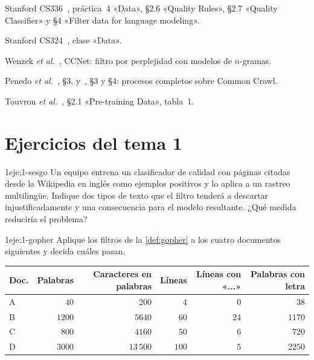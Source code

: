\begin{lecturas}
\item Stanford CS336~\cite{cs336a4}, práctica~4 «Data», §2.6 «Quality Rules», §2.7 «Quality Classifier» y §4 «Filter data for language modeling».
\item Stanford CS324~\cite{cs324}, clase «Data».
\item Wenzek \emph{et al.}~\cite{wenzek}, CCNet: filtro por perplejidad con modelos de $n$-gramas.
\item Penedo \emph{et al.}~\cite{refinedweb}, §3, y~\cite{fineweb}, §3 y §4: procesos completos sobre Common Crawl.
\item Touvron \emph{et al.}~\cite{llama}, §2.1 «Pre-training Data», tabla~1.
\end{lecturas}

\section*{Ejercicios del tema 1}

\begin{ejercicio}{1}{eje:1-sesgo}
Un equipo entrena un clasificador de calidad con páginas citadas desde la Wikipedia en inglés como ejemplos positivos y lo aplica a un rastreo multilingüe. Indique dos tipos de texto que el filtro tenderá a descartar injustificadamente y una consecuencia para el modelo resultante. ¿Qué medida reduciría el problema?
\end{ejercicio}

\begin{ejercicio}{1}{eje:1-gopher}
Aplique los filtros de la \cref{def:gopher} a los cuatro documentos siguientes y decida cuáles pasan.
\begin{center}\small
\begin{tabular}{@{}lrrrrr@{}}
\toprule
Doc. & Palabras & Caracteres en palabras & Líneas & Líneas con «...» & Palabras con letra \\
\midrule
A & $40$ & $200$ & $4$ & $0$ & $38$ \\
B & $1200$ & $5640$ & $60$ & $24$ & $1170$ \\
C & $800$ & $4160$ & $50$ & $6$ & $720$ \\
D & $3000$ & $13\,500$ & $100$ & $5$ & $2250$ \\
\bottomrule
\end{tabular}
\end{center}
\end{ejercicio}

